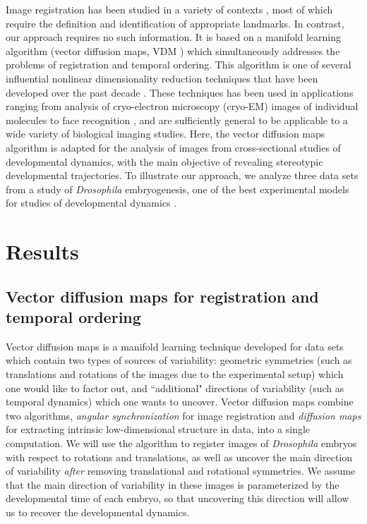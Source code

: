 \documentclass{pnastwo}
\begin{document}
\begin{article}
Image registration has been studied in a variety of contexts \cite{zitova2003image, rowley1998rotation, hajnal2010medical, greenspan1994rotation, zhao2003face}, 
most of which require the definition and identification of appropriate landmarks.
%
In contrast, our approach requires no such information. 
%
It is based on a manifold learning algorithm (vector diffusion maps, VDM \cite{singer2012vector}) which simultaneously addresses the problems of registration and temporal ordering. 
%
This algorithm is one of several influential nonlinear dimensionality reduction techniques that have been developed over the past decade \cite{Belkin2003, coifman2005geometric, coifman2006geometric, tenenbaum2000global, roweis2000nonlinear}. 
%
These techniques has been used in
applications ranging from analysis of cryo-electron microscopy (cryo-EM) images of individual molecules  \cite{zhao2014rotationally, singer2011viewing} to face recognition \cite{lafon2006data}, and are sufficiently general to be applicable to a wide variety of biological imaging studies.
%
Here, the vector diffusion maps algorithm is adapted for the analysis of images from cross-sectional studies of developmental dynamics, with the main objective of revealing stereotypic developmental trajectories.
%
To illustrate our approach, we analyze three data sets from a study of {\it Drosophila} embryogenesis, one of the best experimental models for studies of developmental dynamics \cite{jaeger2012drosophila}.


\section{Results}

\subsection{Vector diffusion maps for registration and temporal ordering}

Vector diffusion maps \cite{singer2012vector} is a manifold learning
technique developed for data sets which contain two types of sources of variability:
geometric symmetries (such as translations and rotations of the images due to the experimental setup) which one would like to factor out,
and ``additional" directions of variability (such as temporal dynamics) which one wants to uncover.
%
Vector diffusion maps combine two algorithms, {\em angular synchronization} \cite{singer2011angular} for image registration and {\em diffusion maps} \cite{coifman2005geometric} for extracting intrinsic low-dimensional structure in data, into a single computation.
%
We will use the algorithm to register images of {\it Drosophila} embryos with respect to rotations and translations, as well as uncover the main direction of variability {\it after} removing translational and rotational symmetries.
%
We assume that the main direction of variability in these images is parameterized by the developmental time of each embryo, so that uncovering this direction will allow us to recover the developmental dynamics.


\end{article}
\end{document}
